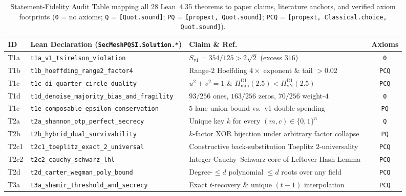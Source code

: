 \documentclass[11pt,reqno]{amsart}
\theoremstyle{definition}
\newcommand{\Hmin}{H_{\min}^{\mathrm{DI}}}
\newcommand{\HvN}{H_{\mathrm{vN}}^{\mathrm{DI}}}
\newcommand{\code}[1]{\texttt{\small #1}}
\begin{document}
\begin{table}[t]
\centering
\caption{Statement-Fidelity Audit Table mapping all $28$ Lean~4.35 theorems to paper claims, literature anchors, and verified axiom footprints (\code{0} = no axioms; \code{Q} = \code{[Quot.sound]}; \code{PQ} = \code{[propext, Quot.sound]}; \code{PCQ} = \code{[propext, Classical.choice, Quot.sound]}).}
\label{tab:fidelity}
\scriptsize
\begin{tabularx}{\linewidth}{@{}l l Y c@{}}
\toprule
\textbf{ID} & \textbf{Lean Declaration (\code{SecMeshPQSI.Solution.*})} & \textbf{Claim \& Ref.} & \textbf{Axioms} \\
\midrule
T1a & \code{t1a\_v1\_tsirelson\_violation} & $S_{\mathrm{v1}}=354/125 > 2\sqrt{2}$ (excess $316$)~\cite{tsirelson1980,secmesh_upstream} & \code{0} \\
T1b & \code{t1b\_hoeffding\_range2\_factor4} & Range-$2$ Hoeffding $4\times$ exponent \& tail $>0.02$~\cite{hoeffding1963} & \code{PCQ} \\
T1c & \code{t1c\_di\_quarter\_circle\_duality} & $u^2+v^2=1$ \& $\Hmin(2.5)<\HvN(2.5)$~\cite{acin2007,pironio2010} & \code{PCQ} \\
T1d & \code{t1d\_denoise\_majority\_bias\_and\_fragility} & $93/256$ ones, $163/256$ zeros, $70/256$ weight-$4$~\cite{secmesh_upstream} & \code{0} \\
T1e & \code{t1e\_composable\_epsilon\_conservation} & $5$-lane union bound vs.\ v1 double-spending~\cite{renner2008,tomamichel2012} & \code{PQ} \\
T2a & \code{t2a\_shannon\_otp\_perfect\_secrecy} & Unique key $k$ for every $(m,c) \in \{0,1\}^n$~\cite{shannon1949} & \code{Q} \\
T2b & \code{t2b\_hybrid\_dual\_survivability} & $k$-factor XOR bijection under arbitrary factor collapse & \code{PQ} \\
T2c1 & \code{t2c1\_toeplitz\_exact\_2\_universal} & Constructive back-substitution Toeplitz $2$-universality~\cite{mansour1993} & \code{PCQ} \\
T2c2 & \code{t2c2\_cauchy\_schwarz\_lhl} & Integer Cauchy--Schwarz core of Leftover Hash Lemma~\cite{hastad1999} & \code{PCQ} \\
T2d & \code{t2d\_carter\_wegman\_poly\_bound} & Degree-$\le d$ polynomial $\le d$ roots over any field~\cite{wegman1981} & \code{PCQ} \\
T3a & \code{t3a\_shamir\_threshold\_and\_secrecy} & Exact $t$-recovery \& unique $(t{-}1)$ interpolation~\cite{shamir1979} & \code{PCQ} \\

\end{tabularx}
\end{table}
\end{document}
